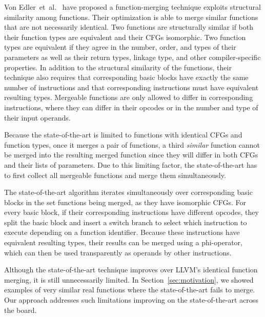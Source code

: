 Von Edler~et~al.~\cite{edler14} have proposed a function-merging technique exploits structural similarity among functions.
Their optimization is able to merge similar functions that are not necessarily
identical.
Two functions are structurally similar if both their function types are equivalent
and their CFGs isomorphic.
Two function types are equivalent if they agree in the number, order, and types
of their parameters as well as
their return types, linkage type, and other compiler-specific properties.
In addition to the structural similarity of the functions, their technique also
requires that corresponding basic blocks have exactly the same number of instructions
and that corresponding instructions must have equivalent resulting types.
Mergeable functions are only allowed to differ in corresponding instructions,
where they can differ in their opcodes or in the number and type of their input operands.


Because the state-of-the-art is limited to functions with identical CFGs
and function types, once it merges a pair of functions, a third
\textit{similar} function cannot be merged into the resulting merged function
since they will differ in both CFGs and their lists of parameters.
Due to this limiting factor, the state-of-the-art has to first collect all
mergeable functions and merge them simultaneously.

The state-of-the-art algorithm iterates simultaneously over corresponding basic
blocks in the set functions being merged, as they have isomorphic CFGs.
For every basic block, if their corresponding instructions have different opcodes,
they split the basic block and insert a switch branch to select which instruction
to execute depending on a function identifier.
Because these instructions have equivalent resulting types, their results can be
merged using a phi-operator, which can then be used transparently as operands
by other instructions.

Although the state-of-the-art technique improves over LLVM's identical function merging, it is
still unnecessarily limited. In Section~\ref{sec:motivation}, we showed examples of very similar
real functions where the state-of-the-art fails to merge. Our approach addresses such limitations
improving on the state-of-the-art across the board.



